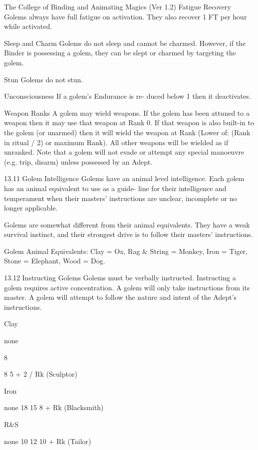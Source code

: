 \begin{Chapter}{The College of Binding and Animating Magics (Ver 1.2)}
Fatigue Recovery Golems always have full fatigue 
on  activation.  They  also  recover  1  FT  per  hour 
while activated. 

Sleep and Charm Golems do not sleep and cannot 
be charmed. However, if the Binder is possessing a 
golem,  they  can  be  slept  or  charmed  by  targeting 
the golem. 

Stun Golems do not stun. 

Unconsciousness  If  a  golem’s  Endurance  is  re-
duced below 1 then it deactivates. 

Weapon  Ranks  A  golem  may  wield  weapons.  If 
the  golem  has  been  attuned  to  a  weapon  then  it 
may  use  that  weapon  at Rank 0.  If  that  weapon  is 
also built-in to the golem (or unarmed) then it will 
wield  the  weapon  at  Rank  (Lower  of:  (Rank  in 
ritual  /  2)  or  maximum  Rank).  All  other  weapons 
will  be  wielded  as  if  unranked.  Note  that  a  golem 
will  not  evade  or  attempt  any  special  manoeuvre 
(e.g. trip, disarm) unless possessed by an Adept. 

13.11 Golem Intelligence 
Golems  have  an  animal  level  intelligence.  Each 
golem has an  animal  equivalent to  use  as  a  guide-
line  for  their  intelligence  and  temperament  when 
their  masters’  instructions  are  unclear,  incomplete 
or no longer applicable. 

Golems  are  somewhat  different  from  their  animal 
equivalents.  They  have  a  weak  survival  instinct, 
and their strongest drive is to follow their masters’ 
instructions. 

Golem  Animal  Equivalents:  Clay  =  Ox,  Rag  \& 
String  = Monkey,  Iron  =  Tiger,  Stone  =  Elephant, 
Wood = Dog. 

13.12 Instructing Golems 
Golems  must  be  verbally  instructed.  Instructing  a 
golem requires  active  concentration. A  golem  will 
only  take  instructions  from  its  master.  A  golem 
will  attempt  to  follow  the  nature  and  intent  of  the 
Adept’s instructions. 

 

 

Clay 

none 

8 

8  5 + 2 / Rk (Sculptor) 

Iron 

none  18  15  8 + Rk (Blacksmith) 

R\&S 

none  10  12  10 + Rk (Tailor) 


\end{Chapter}

